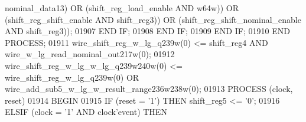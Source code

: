 \begin{DoxyCode}
{{      nominal_data13}\textcolor{vhdlchar}{)} \textcolor{keywordflow}{OR} \textcolor{vhdlchar}{(}\textcolor{vhdlchar}{shift_reg_load_enable} \textcolor{keywordflow}{AND} \textcolor{vhdlchar}{w64w}\textcolor{vhdlchar}{)}\textcolor{vhdlchar}{)} \textcolor{keywordflow}{OR} \textcolor{vhdlchar}{(}\textcolor{vhdlchar}{shift_reg_shift_enable} \textcolor{keywordflow}{AND} \textcolor{vhdlchar}{
      shift_reg3}\textcolor{vhdlchar}{)}\textcolor{vhdlchar}{)} \textcolor{keywordflow}{OR} \textcolor{vhdlchar}{(}\textcolor{vhdlchar}{shift_reg_shift_nominal_enable} \textcolor{keywordflow}{AND} \textcolor{vhdlchar}{shift_reg3}\textcolor{vhdlchar}{)}\textcolor{vhdlchar}{)};
01907                 \textcolor{keywordflow}{END} \textcolor{keywordflow}{IF};
01908             \textcolor{keywordflow}{END} \textcolor{keywordflow}{IF};
01909         \textcolor{keywordflow}{END} \textcolor{keywordflow}{IF};
01910     \textcolor{keywordflow}{END} \textcolor{keywordflow}{PROCESS};
01911     \textcolor{vhdlchar}{wire_shift_reg_w_lg_q239w}\textcolor{vhdlchar}{(}\textcolor{vhdllogic}{}\textcolor{vhdllogic}{0}\textcolor{vhdlchar}{)} \textcolor{vhdlchar}{<=} \textcolor{vhdlchar}{shift_reg4} \textcolor{keywordflow}{AND} \textcolor{vhdlchar}{
      wire_w_lg_read_nominal_out217w}\textcolor{vhdlchar}{(}\textcolor{vhdllogic}{}\textcolor{vhdllogic}{0}\textcolor{vhdlchar}{)};
01912     \textcolor{vhdlchar}{wire_shift_reg_w_lg_w_lg_q239w240w}\textcolor{vhdlchar}{(}\textcolor{vhdllogic}{}\textcolor{vhdllogic}{0}\textcolor{vhdlchar}{)} \textcolor{vhdlchar}{<=} \textcolor{vhdlchar}{wire_shift_reg_w_lg_q239w}\textcolor{vhdlchar}{(}\textcolor{vhdllogic}{}\textcolor{vhdllogic}{0}\textcolor{vhdlchar}{)} \textcolor{keywordflow}{OR} \textcolor{vhdlchar}{
      wire_add_sub5_w_lg_w_result_range236w238w}\textcolor{vhdlchar}{(}\textcolor{vhdllogic}{}\textcolor{vhdllogic}{0}\textcolor{vhdlchar}{)};
01913     \textcolor{keywordflow}{PROCESS} (clock, reset)
01914 \textcolor{vhdlkeyword}{    BEGIN}
01915         \textcolor{keywordflow}{IF} \textcolor{vhdlchar}{(}\textcolor{vhdlchar}{reset} \textcolor{vhdlchar}{=} \textcolor{vhdlchar}{'}\textcolor{vhdllogic}{}\textcolor{vhdllogic}{1}\textcolor{vhdlchar}{'}\textcolor{vhdlchar}{)} \textcolor{keywordflow}{THEN} \textcolor{vhdlchar}{shift_reg5} \textcolor{vhdlchar}{<=} \textcolor{vhdlchar}{'}\textcolor{vhdllogic}{}\textcolor{vhdllogic}{0}\textcolor{vhdlchar}{'};
01916         \textcolor{keywordflow}{ELSIF} \textcolor{vhdlchar}{(}\textcolor{vhdlchar}{clock} \textcolor{vhdlchar}{=} \textcolor{vhdlchar}{'}\textcolor{vhdllogic}{}\textcolor{vhdllogic}{1}\textcolor{vhdlchar}{'} \textcolor{keywordflow}{AND} \textcolor{vhdlchar}{clock}\textcolor{vhdlchar}{'}\textcolor{vhdlkeyword}{event}\textcolor{vhdlchar}{)} \textcolor{keywordflow}{THEN} 
}
\end{DoxyCode}
